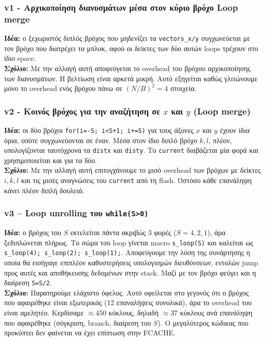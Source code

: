 \documentclass[11pt,a4paper]{article}
\newcommand{\code}[1]{\texttt{#1}}
\newcommand{\en}[1]{\foreignlanguage{english}{#1}}
\begin{document}
\subsubsection{v1 - Αρχικοποίηση διανυσμάτων μέσα στον κύριο βρόχο \en{Loop merge}}
\textbf{Ιδέα:} ο ξεχωριστός διπλός βρόχος που μηδενίζει τα \code{vectors\_x/y} συγχωνεύεται
με τον βρόχο που διατρέχει τα μπλοκ, αφού οι δείκτες των δύο αυτών loops τρέχουν στο ίδιο space.\\
\textbf{Σχόλιο:} Με την αλλαγή αυτή αποφεύγεται το overhead του βρόχου αρχικοποίησης των διανυσμάτων. Η βελτίωση είναι αρκετά μικρή. Αυτό εξηγείται καθώς γλιτώνουμε μόνο το \en{overhead} ενός βρόχου πάνω σε
$(N/B)^2=4$ στοιχεία.

\subsubsection{v2 - Κοινός βρόχος για την αναζήτηση σε $x$ και $y$ (\en{Loop merge})}
\textbf{Ιδέα:} οι δύο βρόχοι \code{for(i=-S; i<S+1; i+=S)} για τους άξονες $x$ και $y$ έχουν
ίδια όρια, οπότε συγχωνεύονται σε έναν. Μέσα στον ίδιο διπλό βρόχο $k,l$, πλέον, υπολογίζονται ταυτόχρονα τα \code{distx} και
\code{disty}. Το \code{current} διαβάζεται μία φορά και χρησιμοποιείται και για τα δύο.\\
\textbf{Σχόλιο:} Με την αλλαγή αυτή επιτυγχάνουμε το μισό \en{overhead} των βρόχων με δείκτες $i,k,l$ και τις μισές αναγνώσεις του
\code{current} από τη flash. Ωστόσο κάθε επανάληψη κάνει πλέον διπλή δουλειά.

\subsubsection{v3 -- \en{Loop unrolling} του \code{while(S>0)}}
\textbf{Ιδέα:} ο βρόχος του $S$ εκτελείται πάντα ακριβώς 3 φορές ($S=4,2,1$), άρα ξεδιπλώνεται πλήρως. Tο σώμα του loop γίνεται \en{macro} \code{s\_loop(S)} και καλείται ως
\code{s\_loop(4); s\_loop(2); s\_loop(1);}. Αποφεύγουμε την λύση της συνάρτησης η οποία θα εισήγαγε επιπλέον καθυστερήσεις υπολογισμών διευθύνσεων, εντολών jump προς αυτές και αποθήκευσης δεδομένων στην stack. Μαζί με τον βρόχο φεύγει και η διαίρεση \code{S=S/2}.\\
\textbf{Σχόλιο:} Παρατηρούμε ελάχιστο όφελος. Αυτό οφείλεται στο γεγονός ότι ο βρόχος που αφαιρέθηκε είναι εξωτερικός (12 επαναλήψεις συνολικά),
άρα το overhead του είναι αμελητέο. Κερδίσαμε $\approx\num{450}$ κύκλους, δηλαδή $\approx 37$ κύκλους ανά επανάληψη που
αφαιρέθηκε (σύγκριση, \en{branch}, διαίρεση του $S$). Ο μεγαλύτερος κώδικας που προκύπτει δεν φαίνεται να έχει επίπτωση στην FCACHE.
\end{document}
